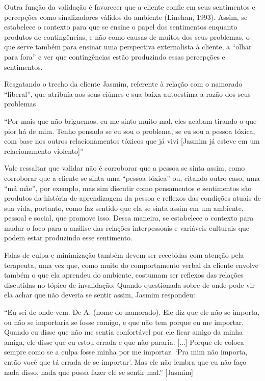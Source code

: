 Outra função da validação é favorecer que a cliente confie em seus sentimentos e percepções como sinalizadores válidos do ambiente (Linehan, 1993). Assim, se estabelece o contexto para que se ensine o papel dos sentimentos enquanto produtos de contingências, e não como causas de muitos dos seus problemas, o que serve também para ensinar uma perspectiva externalista à cliente, a ``olhar para fora'' e ver que contingências estão produzindo essas percepções e sentimentos. 

Resgatando o trecho da cliente Jasmim, referente à relação com o namorado ``liberal'', que atribuía aos seus ciúmes e sua baixa autoestima a razão dos seus problemas

``Por mais que não briguemos, eu me sinto muito mal, eles acabam tirando o que pior há de mim. Tenho pensado se eu sou o problema, se eu sou a pessoa tóxica, com base nos outros relacionamentos tóxicos que já vivi [Jasmim já esteve em um relacionamento violento]''

Vale ressaltar que validar não é corroborar que a pessoa se sinta assim, como corroborar que a cliente se sinta uma ``pessoa tóxica'' ou, citando outro caso, uma ``má mãe'', por exemplo, mas sim discutir como pensamentos e sentimentos são produtos da história de aprendizagem da pessoa e reflexos das condições atuais de sua vida, portanto, como faz sentido que ela se sinta assim em um ambiente, pessoal e social, que promove isso. Dessa maneira, se estabelece o contexto para mudar o foco para a análise das relações interpessoais e variáveis culturais que podem estar produzindo esse sentimento. 

Falas de culpa e minimização também devem ser recebidas com atenção pela terapeuta, uma vez que, como muito do comportamento verbal da cliente envolve também o que ela aprendeu do ambiente, costumam ser reflexos das relações discutidas no tópico de invalidação. Quando questionada sobre de onde pode vir ela achar que não deveria se sentir assim, Jasmim respondeu:

``Eu sei de onde vem. De A. (nome do namorado). Ele diz que ele não se importa, ou não se importaria se fosse comigo, e que não tem porque eu me importar. Quando eu disse que não me sentia confortável por ele ficar amigo da minha amiga, ele disse que eu estou errada e que não pararia. [...] Porque ele coloca sempre como se a culpa fosse minha por me importar. ‘Pra mim não importa, então você que tá errada de se importar’. Mas ele não lembra que eu não faço nada disso, nada que possa fazer ele se sentir mal.'' [Jasmim]

